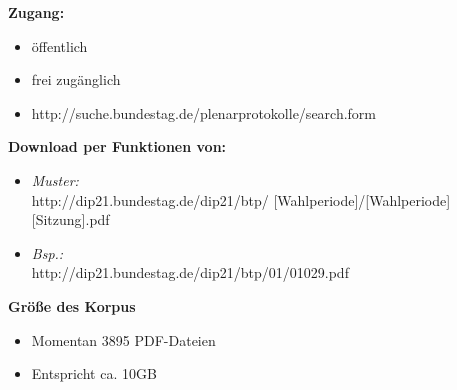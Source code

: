 \documentclass[11pt, a4paper]{beamer}
\begin{document}
\begin{frame}
\textbf{Zugang:}
\begin{itemize}
\item öffentlich
\item frei zugänglich
\item http://suche.bundestag.de/plenarprotokolle/search.form\\[1em]
\end{itemize}
\textbf{Download per Funktionen von:}
\begin{itemize}
\item \textit{Muster:}\\
http://dip21.bundestag.de/dip21/btp/ [Wahlperiode]/[Wahlperiode][Sitzung].pdf
\item \textit{Bsp.:}\\ http://dip21.bundestag.de/dip21/btp/01/01029.pdf\\[1em]
\end{itemize}
\textbf{Größe des Korpus}
\begin{itemize}
\item Momentan 3895 PDF-Dateien
\item Entspricht ca. 10GB
\end{itemize}
\end{frame}
\end{document}
